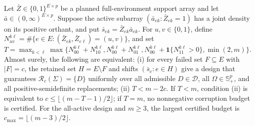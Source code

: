 Let \(\bar Z\in\{0,1\}^{E\times p}\) be a planned full-environment support array and let \(\bar a\in(0,\infty)^{E\times p}\). Suppose the active subarray \((\bar a_{ek}:\bar Z_{ek}=1)\) has a joint density on its positive orthant, and put \(\bar s_{ek}=\bar Z_{ek}\bar a_{ek}\). For \(u,v\in\{0,1\}\), define \(N_{uv}^{k\ell}=\#\{e\in E:(\bar Z_{ek},\bar Z_{e\ell})=(u,v)\}\), and set \(T=\max_{k<\ell}\max\{N_{00}^{k\ell}+N_{10}^{k\ell},N_{00}^{k\ell}+N_{01}^{k\ell},N_{00}^{k\ell}+\mathbf 1\{N_{11}^{k\ell}>0\},\min(2,m)\}\). Almost surely, the following are equivalent: (i) for every failed set \(F\subseteq E\) with \(|F|=c\), the retained set \(H=E\setminus F\) and shifts \((\bar s_e:e\in H)\) give a design that guarantees \(\mathcal R_c(\Sigma)=\{D\}\) uniformly over all admissible \(D\in\mathcal D\), all \(\Omega\in\mathbb S_+^p\), and all positive-semidefinite replacements; (ii) \(T<m-2c\). If \(T<m\), condition (ii) is equivalent to \(c\le\lfloor(m-T-1)/2\rfloor\); if \(T=m\), no nonnegative corruption budget is certified. For the all-active design and \(m\ge3\), the largest certified budget is \(c_{\max}=\lfloor(m-3)/2\rfloor\).